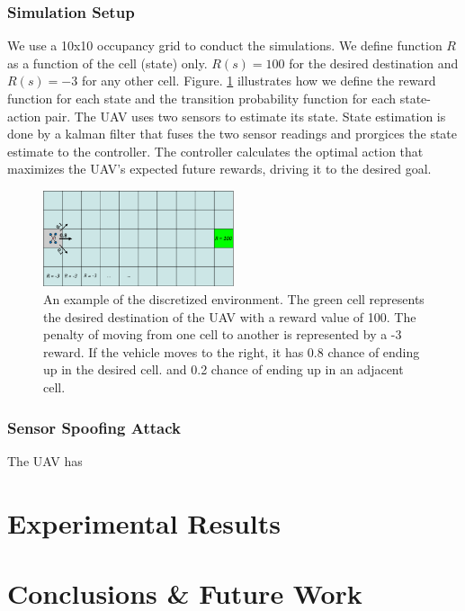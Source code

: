 \documentclass[letterpaper, 10 pt, conference]{ieeeconf}  %
\begin{document}
\subsubsection{Simulation Setup}
We use a 10x10 occupancy grid to conduct the simulations. We define function $R$ as a function of the cell (state) only. $R(s) = 100$ for the desired destination and $R(s) = -3$ for any other cell. Figure. \ref{fig:sim-env} illustrates how we define the reward function for each state and the transition probability function for each state-action pair. The UAV uses two sensors to estimate its state. State estimation is done by a kalman filter that fuses the two sensor readings and prorgices the state estimate to the controller. The controller calculates the optimal action that maximizes the UAV's expected future rewards, driving it to the desired goal.
\begin{figure}[h]
\centering
\includegraphics[width=0.5\textwidth]{sim-env}
\caption{An example of the discretized environment. The green cell represents the desired destination of the UAV with a reward value of 100. The penalty of moving from one cell to another is represented by a -3 reward. If the vehicle moves to the right, it has 0.8 chance of ending up in the desired cell. and 0.2 chance of ending up in an adjacent cell.}
 \label{fig:sim-env}
\end{figure}
\subsubsection{Sensor Spoofing Attack}
The UAV has
\section{Experimental Results}\label{sec:exp}
\section{Conclusions \& Future Work}\label{sec:conclusion}




\end{document}
